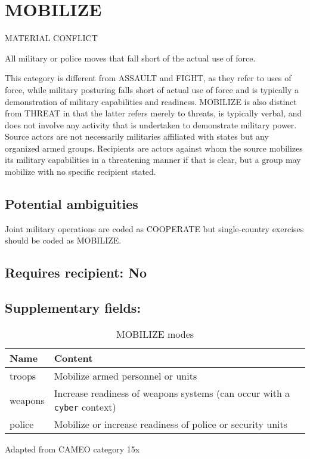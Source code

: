 \documentclass[11pt]{report}
\newcommand{\plcat}[1]{\textsf{#1}}
\newcommand{\txt}[1]{\texttt{#1}}
\begin{document}
\newpage  

\section{MOBILIZE}

\textsf{MATERIAL CONFLICT} \vspace{8pt}


All military or police moves that fall short of the actual use of force. 

This category is different from \plcat{ASSAULT} and \plcat{FIGHT}, as they refer to uses of force, while military posturing falls short of actual use of force and is typically a demonstration of military capabilities and readiness. \plcat{MOBILIZE} is also distinct from \plcat{THREAT} in that the latter refers merely to threats, is typically verbal, and does not involve any activity that is undertaken to demonstrate military power. Source actors  are not necessarily militaries affiliated with states but any organized armed groups. Recipients are actors against whom the source mobilizes its military capabilities in a threatening manner if that is clear, but a group may mobilize with no specific recipient stated.

\subsection{Potential ambiguities}

Joint military operations are coded as \plcat{COOPERATE} but single-country exercises should be coded as \plcat{MOBILIZE}.

\subsection{Requires recipient: No}

\subsection{Supplementary fields: }

\begin{table}[htp]
\caption{MOBILIZE modes}
\begin{center}
\begin{tabular}{|l|p{13cm}|}
\hline
Name & Content \\
\hline
troops & Mobilize armed personnel or units\\
weapons & Increase readiness of weapons systems (can occur with a \txt{cyber} context) \\
police & Mobilize or increase readiness of police or security units\\
\hline
\end{tabular}
\end{center}
\label{tab:mobilizemode}
Adapted from CAMEO category 15x
\end{table}
\end{document}
